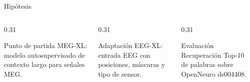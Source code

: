\documentclass[aspectratio=169,10pt]{beamer}
\begin{document}
\begin{frame}[c]{Hipótesis}

  \begin{columns}[T,totalwidth=\linewidth]
    \begin{column}{0.31\linewidth}
      \begin{block}{Punto de partida}
        MEG-XL: modelo autosupervisado de contexto largo para señales MEG.
      \end{block}
    \end{column}
    \begin{column}{0.31\linewidth}
      \begin{block}{Adaptación}
        EEG-XL: entrada EEG con posiciones, máscaras y tipo de sensor.
      \end{block}
    \end{column}
    \begin{column}{0.31\linewidth}
      \begin{block}{Evaluación}
        Recuperación Top-10 de palabras sobre OpenNeuro ds004408.
      \end{block}
    \end{column}
  \end{columns}

  \vspace{3mm}

  \begin{center}
  \end{center}

\end{frame}
\end{document}
